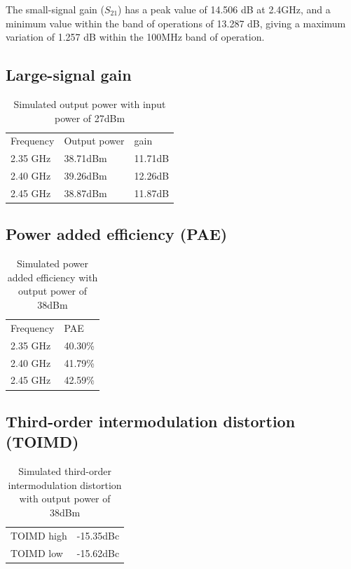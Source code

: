   The small-signal gain ($S_{21}$) has a peak value of 14.506 dB at 2.4GHz, and a minimum value within the band of operations of 13.287 dB, giving a maximum variation of 1.257 dB within the 100MHz band of operation.

  \subsection{Large-signal gain}

  \begin{table}[H]
	  \centering
	  \begin{tabular}{l l l}
		  Frequency & Output power & gain \\
		  2.35 GHz & 38.71dBm & 11.71dB \\
		  2.40 GHz & 39.26dBm & 12.26dB \\
		  2.45 GHz & 38.87dBm & 11.87dB
	  \end{tabular}
	  \caption{Simulated output power with input power of 27dBm}
	  \label{tab:sim_power}
  \end{table}

  \subsection{Power added efficiency (PAE)}
  
  \begin{table}[H]
	  \centering
	  \begin{tabular}{l l}
		  Frequency & PAE \\
		  2.35 GHz & 40.30\% \\
		  2.40 GHz & 41.79\% \\
		  2.45 GHz & 42.59\%
	  \end{tabular}
	  \caption{Simulated power added efficiency with output power of 38dBm}
	  \label{tab:sim_pae}
  \end{table}

  \subsection{Third-order intermodulation distortion (TOIMD)}

  \begin{table}[H]
	  \centering
	  \begin{tabular}{l l}
		  TOIMD high & -15.35dBc \\
		  TOIMD low & -15.62dBc
	  \end{tabular}
	  \caption{Simulated third-order intermodulation distortion with output power of 38dBm}
	  \label{tab:sim_toimd}
  \end{table}

